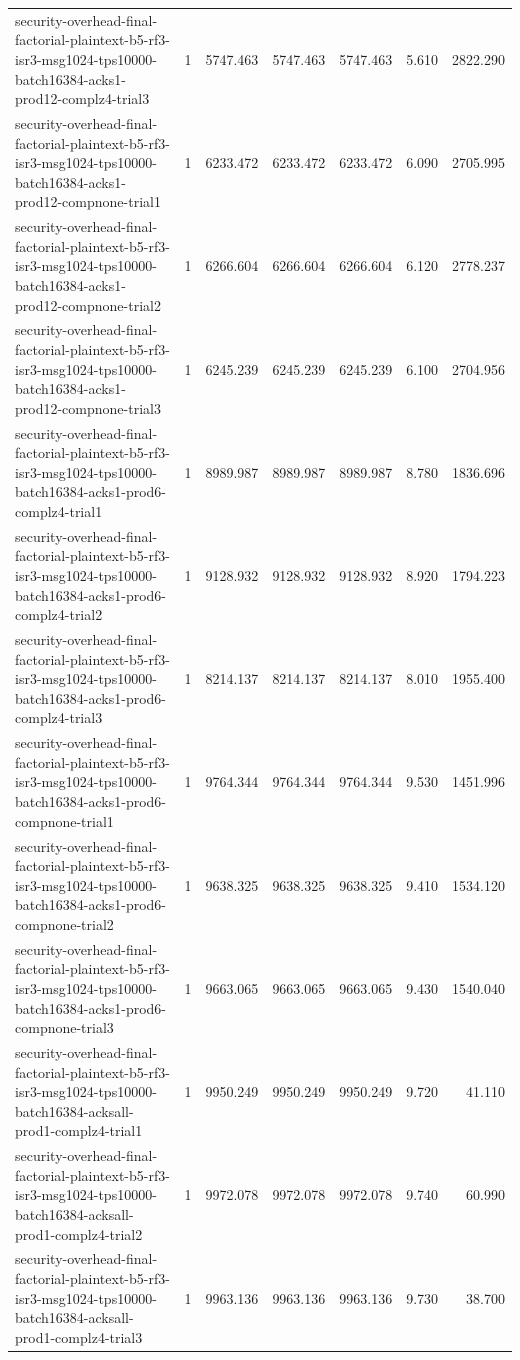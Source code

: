 \begin{tabular}{lrrrrrr}
security-overhead-final-factorial-plaintext-b5-rf3-isr3-msg1024-tps10000-batch16384-acks1-prod12-complz4-trial3 & 1 & 5747.463 & 5747.463 & 5747.463 & 5.610 & 2822.290 \\
security-overhead-final-factorial-plaintext-b5-rf3-isr3-msg1024-tps10000-batch16384-acks1-prod12-compnone-trial1 & 1 & 6233.472 & 6233.472 & 6233.472 & 6.090 & 2705.995 \\
security-overhead-final-factorial-plaintext-b5-rf3-isr3-msg1024-tps10000-batch16384-acks1-prod12-compnone-trial2 & 1 & 6266.604 & 6266.604 & 6266.604 & 6.120 & 2778.237 \\
security-overhead-final-factorial-plaintext-b5-rf3-isr3-msg1024-tps10000-batch16384-acks1-prod12-compnone-trial3 & 1 & 6245.239 & 6245.239 & 6245.239 & 6.100 & 2704.956 \\
security-overhead-final-factorial-plaintext-b5-rf3-isr3-msg1024-tps10000-batch16384-acks1-prod6-complz4-trial1 & 1 & 8989.987 & 8989.987 & 8989.987 & 8.780 & 1836.696 \\
security-overhead-final-factorial-plaintext-b5-rf3-isr3-msg1024-tps10000-batch16384-acks1-prod6-complz4-trial2 & 1 & 9128.932 & 9128.932 & 9128.932 & 8.920 & 1794.223 \\
security-overhead-final-factorial-plaintext-b5-rf3-isr3-msg1024-tps10000-batch16384-acks1-prod6-complz4-trial3 & 1 & 8214.137 & 8214.137 & 8214.137 & 8.010 & 1955.400 \\
security-overhead-final-factorial-plaintext-b5-rf3-isr3-msg1024-tps10000-batch16384-acks1-prod6-compnone-trial1 & 1 & 9764.344 & 9764.344 & 9764.344 & 9.530 & 1451.996 \\
security-overhead-final-factorial-plaintext-b5-rf3-isr3-msg1024-tps10000-batch16384-acks1-prod6-compnone-trial2 & 1 & 9638.325 & 9638.325 & 9638.325 & 9.410 & 1534.120 \\
security-overhead-final-factorial-plaintext-b5-rf3-isr3-msg1024-tps10000-batch16384-acks1-prod6-compnone-trial3 & 1 & 9663.065 & 9663.065 & 9663.065 & 9.430 & 1540.040 \\
security-overhead-final-factorial-plaintext-b5-rf3-isr3-msg1024-tps10000-batch16384-acksall-prod1-complz4-trial1 & 1 & 9950.249 & 9950.249 & 9950.249 & 9.720 & 41.110 \\
security-overhead-final-factorial-plaintext-b5-rf3-isr3-msg1024-tps10000-batch16384-acksall-prod1-complz4-trial2 & 1 & 9972.078 & 9972.078 & 9972.078 & 9.740 & 60.990 \\
security-overhead-final-factorial-plaintext-b5-rf3-isr3-msg1024-tps10000-batch16384-acksall-prod1-complz4-trial3 & 1 & 9963.136 & 9963.136 & 9963.136 & 9.730 & 38.700 \\

\end{tabular}
